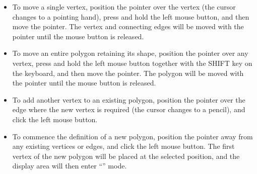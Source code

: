 \documentclass[11pt,nolof]{starlink}
\begin{document}
\begin{itemize}

\item To move a single vertex, position the pointer over the vertex (the
cursor changes to a pointing hand), press and hold the left mouse button,
and then move the pointer. The vertex and connecting edges will be moved
with the pointer until the mouse button is released.

\item To move an entire polygon retaining its shape, position the pointer
over any vertex, press and hold the left mouse button together with the
SHIFT key on the keyboard, and then move the pointer. The polygon will be
moved with the pointer until the mouse button is released.

\item To add another vertex to an existing polygon, position the pointer
over the edge where the new vertex is required (the cursor changes to a
pencil), and click the left mouse button.

\item To commence the definition of a new polygon, position the pointer
away from any existing vertices or edges, and click the left mouse button.
The first vertex of the new polygon will be placed at the selected
position, and the display area will then enter ``'' mode.

\end{itemize}
\end{document}
